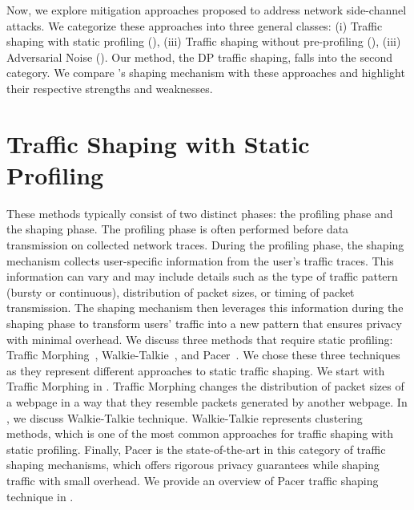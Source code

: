 Now, we explore mitigation approaches proposed to address network side-channel attacks. 
We categorize these approaches into three general classes: (i) Traffic shaping with static profiling (), (iii) Traffic shaping without pre-profiling (), (iii) Adversarial Noise ().
Our method, the DP traffic shaping, falls into the second category. 
We compare {\sys}'s shaping mechanism with these approaches and highlight their respective strengths and weaknesses.



\section{Traffic Shaping with Static Profiling}\label{subsec:static-traffic-shaping}
These methods typically consist of two distinct phases: the profiling phase and the shaping phase.
The profiling phase is often performed before data transmission on collected network traces.  
During the profiling phase, the shaping mechanism collects user-specific information from the user's traffic traces.
This information can vary and may include details such as the type of traffic pattern (\ie bursty or continuous), distribution of packet sizes, or timing of packet transmission.
The shaping mechanism then leverages this information during the shaping phase to transform users' traffic into a new pattern that ensures privacy with minimal overhead.
We discuss three methods that require static profiling: Traffic Morphing~\cite{wright2009traffic}, Walkie-Talkie~\cite{wang2017walkie}, and Pacer~\cite{mehta2022pacer}.
We chose these three techniques as they represent different approaches to static traffic shaping.
We start with Traffic Morphing in .
Traffic Morphing changes the distribution of packet sizes of a webpage in a way that they resemble packets generated by another webpage.
In , we discuss Walkie-Talkie technique.
Walkie-Talkie represents clustering methods, which is one of the most common approaches for traffic shaping with static profiling.
Finally, Pacer is the state-of-the-art in this category of traffic shaping mechanisms, which offers rigorous privacy guarantees while shaping traffic with small overhead.
We provide an overview of Pacer traffic shaping technique in .   

